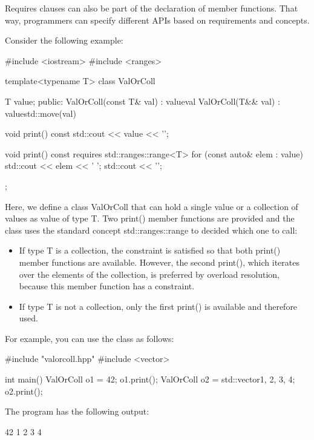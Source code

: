 Requires clauses can also be part of the declaration of member functions. That way, programmers can specify different APIs based on requirements and concepts.

Consider the following example:


\begin{cpp}
#include <iostream>
#include <ranges>

template<typename T>
class ValOrColl {
	T value;
	public:
	ValOrColl(const T& val)
	: value{val} {
	}
	ValOrColl(T&& val)
	: value{std::move(val)} {
	}
	
	void print() const {
		std::cout << value << '\n';
	}
	
	void print() const requires std::ranges::range<T> {
		for (const auto& elem : value) {
			std::cout << elem << ' ';
		}
		std::cout << '\n';
	}
};
\end{cpp}

Here, we define a class ValOrColl that can hold a single value or a collection of values as value of type T. Two print() member functions are provided and the class uses the standard concept std::ranges::range to decided which one to call:

\begin{itemize}
\item
If type T is a collection, the constraint is satisfied so that both print() member functions are available. However, the second print(), which iterates over the elements of the collection, is preferred by overload resolution, because this member function has a constraint.

\item
If type T is not a collection, only the first print() is available and therefore used.
\end{itemize}

For example, you can use the class as follows:


\begin{cpp}
#include "valorcoll.hpp"
#include <vector>

int main()
{
	ValOrColl o1 = 42;
	o1.print();
	ValOrColl o2 = std::vector{1, 2, 3, 4};
	o2.print();
}
\end{cpp}

The program has the following output:

\begin{shell}
42
1 2 3 4
\end{shell}

